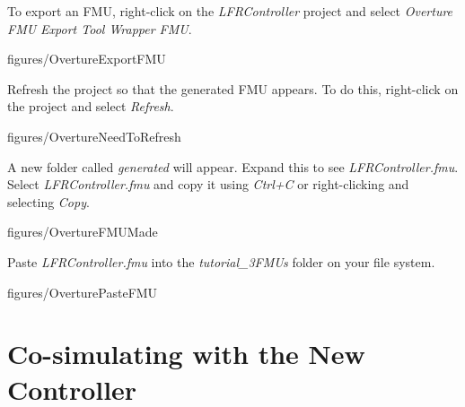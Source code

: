 \documentclass[11pt,a4paper]{../tutorial}
\begin{document}
\begin{instructions}
\item \label{step:exp1} To export an FMU, right-click on the \emph{LFRController} project and select \emph{Overture FMU \menusep Export Tool Wrapper FMU}.

    \begin{annotation}[width=0.99\linewidth]{figures/OvertureExportFMU}
    \end{annotation}

\newpage
\item Refresh the project so that the generated FMU appears. To do this, right-click on the project and select \emph{Refresh}.

    \begin{annotation}[width=0.99\linewidth,trim=0 250 0 0,clip]{figures/OvertureNeedToRefresh}
    \end{annotation}

\item A new folder called \emph{generated} will appear. Expand this to see \emph{LFRController.fmu}. Select \emph{LFRController.fmu} and copy it using \emph{Ctrl+C} or right-clicking and selecting \emph{Copy}.

    \begin{annotation}[width=0.25\linewidth,trim=0 340 535 60,clip]{figures/OvertureFMUMade}
    \end{annotation}

\item \label{step:exp2} Paste \emph{LFRController.fmu} into the \emph{tutorial\_3\pathsep{}FMUs} folder on your file system.

    \begin{annotation}[width=0.8\linewidth]{figures/OverturePasteFMU}
    \end{annotation}

\end{instructions}

\newpage
\section{Co-simulating with the New Controller}
\end{document}

